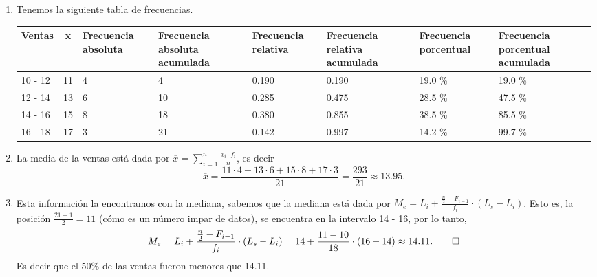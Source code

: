 \begin{solution}
    \begin{enumerate}
        \item Tenemos la siguiente tabla de frecuencias.
        \begin{table}[H]
            \centering
            \begin{tabular}{|p{1.7cm}| c |p{1.8cm}|p{2cm}|p{1.8cm}|p{2cm}|p{2cm}|p{2cm}|}
                \hline
                Ventas & x & Frecuencia absoluta & Frecuencia absoluta acumulada & Frecuencia relativa & Frecuencia relativa acumulada & Frecuencia porcentual & Frecuencia porcentual acumulada\\
                \hline\hline
                10 - 12 & 11 & 4 &  4 & 0.190 & 0.190 & 19.0 \% & 19.0 \% \\\hline
                12 - 14 & 13 & 6 & 10 & 0.285 & 0.475 & 28.5 \% & 47.5 \% \\\hline
                14 - 16 & 15 & 8 & 18 & 0.380 & 0.855 & 38.5 \% & 85.5 \% \\\hline
                16 - 18 & 17 & 3 & 21 & 0.142 & 0.997 & 14.2 \% & 99.7 \% \\\hline
            \end{tabular}
        \end{table}
        \item La media de la ventas está dada por $\overline{x} = \sum_{i = 1}^{n} \frac{x_i \cdot f_i}{n}$, es decir
        \[
            \overline{x} = \frac{11\cdot 4 +  13 \cdot 6 + 15 \cdot 8 + 17 \cdot 3}{21} = \frac{293}{21} \approx 13.95.
        \]
        \item Esta información la encontramos con la mediana, sabemos que la mediana está dada por $M_e = L_i + \frac{\frac{n}{2} - F_{i - 1}}{f_i}\cdot (L_s - L_i)$.
        Esto es, la posición $\frac{21 + 1}{2} = 11$ (cómo es un número impar de datos), se encuentra en la intervalo 14 - 16, por lo tanto,
        \[
            M_e = L_i + \frac{\frac{n}{2} - F_{i - 1}}{f_i}\cdot (L_s - L_i) = 14 + \frac{11 - 10}{18}\cdot (16 - 14) \approx 14.11. \qedhere
        \]
        Es decir que el 50\% de las ventas fueron menores que 14.11.
    \end{enumerate}
\end{solution}